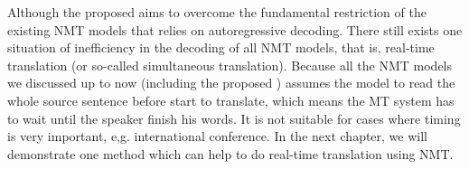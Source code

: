 Although the proposed \model{} aims to overcome the fundamental restriction of the existing NMT models that relies on autoregressive decoding.
There still exists one situation of inefficiency in the decoding of all NMT models, that is,  real-time translation (or so-called simultaneous translation).
Because all the NMT models we discussed up to now (including the proposed \model{}) assumes the model to read the whole source sentence before start to translate, which means the MT system has to wait until the speaker finish his words.
It is not suitable for cases where timing is very important, e,g. international conference. In the next chapter, we will demonstrate one method which can help to do real-time translation using NMT.


  
